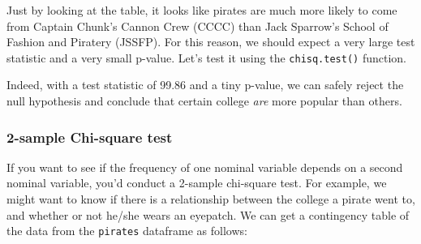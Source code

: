\documentclass[]{book}
\newenvironment{Shaded}{\begin{snugshade}}{\end{snugshade}}
\newcommand{\KeywordTok}[1]{\textcolor[rgb]{0.13,0.29,0.53}{\textbf{#1}}}
\newcommand{\DataTypeTok}[1]{\textcolor[rgb]{0.13,0.29,0.53}{#1}}
\newcommand{\StringTok}[1]{\textcolor[rgb]{0.31,0.60,0.02}{#1}}
\newcommand{\CommentTok}[1]{\textcolor[rgb]{0.56,0.35,0.01}{\textit{#1}}}
\newcommand{\OperatorTok}[1]{\textcolor[rgb]{0.81,0.36,0.00}{\textbf{#1}}}
\newcommand{\NormalTok}[1]{#1}
\theoremstyle{definition}
\theoremstyle{definition}
\theoremstyle{remark}
\begin{document}
\begin{Shaded}
\end{Shaded}

Just by looking at the table, it looks like pirates are much more likely
to come from Captain Chunk's Cannon Crew (CCCC) than Jack Sparrow's
School of Fashion and Piratery (JSSFP). For this reason, we should
expect a very large test statistic and a very small p-value. Let's test
it using the \texttt{chisq.test()} function.

\begin{Shaded}
\end{Shaded}

Indeed, with a test statistic of 99.86 and a tiny p-value, we can safely
reject the null hypothesis and conclude that certain college \emph{are}
more popular than others.

\subsubsection{2-sample Chi-square test}\label{sample-chi-square-test-1}

If you want to see if the frequency of one nominal variable depends on a
second nominal variable, you'd conduct a 2-sample chi-square test. For
example, we might want to know if there is a relationship between the
college a pirate went to, and whether or not he/she wears an eyepatch.
We can get a contingency table of the data from the \texttt{pirates}
dataframe as follows:

\begin{Shaded}
\end{Shaded}
\end{document}
